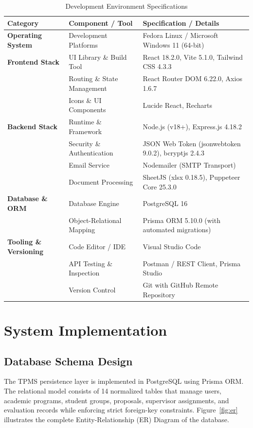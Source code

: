 \documentclass[12pt,a4paper]{report}
\begin{document}
\begin{table}[H]
\centering
\caption{Development Environment Specifications}
\label{tab:dev_env}
\vspace{4pt}
\small
\begin{tabularx}{\textwidth}{@{}l p{4.2cm} X@{}}
\toprule
\textbf{Category} & \textbf{Component / Tool} & \textbf{Specification / Details} \\
\midrule
\textbf{Operating System} & Development Platforms & Fedora Linux / Microsoft Windows 11 (64-bit) \\

\textbf{Frontend Stack} & UI Library \& Build Tool & React 18.2.0, Vite 5.1.0, Tailwind CSS 4.3.3 \\
 & Routing \& State Management & React Router DOM 6.22.0, Axios 1.6.7 \\
 & Icons \& UI Components & Lucide React, Recharts \\

\textbf{Backend Stack} & Runtime \& Framework & Node.js (v18+), Express.js 4.18.2 \\
 & Security \& Authentication & JSON Web Token (jsonwebtoken 9.0.2), bcryptjs 2.4.3 \\
 & Email Service & Nodemailer (SMTP Transport) \\
 & Document Processing & SheetJS (xlsx 0.18.5), Puppeteer Core 25.3.0 \\

\textbf{Database \& ORM} & Database Engine & PostgreSQL 16 \\
 & Object-Relational Mapping & Prisma ORM 5.10.0 (with automated migrations) \\

\textbf{Tooling \& Versioning} & Code Editor / IDE & Visual Studio Code \\
 & API Testing \& Inspection & Postman / REST Client, Prisma Studio \\
 & Version Control & Git with GitHub Remote Repository \\
\bottomrule
\end{tabularx}
\end{table}

\section{System Implementation}

\subsection{Database Schema Design}
The TPMS persistence layer is implemented in PostgreSQL using Prisma ORM. The relational model consists of 14 normalized tables that manage users, academic programs, student groups, proposals, supervisor assignments, and evaluation records while enforcing strict foreign-key constraints. Figure~\ref{fig:er} illustrates the complete Entity-Relationship (ER) Diagram of the database.
\end{document}
